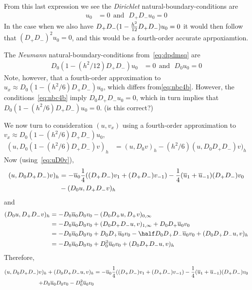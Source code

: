 From this last expression we see the {\em Dirichlet} natural-boundary-conditions are 
\begin{align}
   u_0 &= 0 ~~\text{and}~~~  D_+D_- u_0 =0  \label{eq:nbc4a} 
\end{align}
In the case when we also have $D_+D_-(1-{h^2\over 12}D_+D_-)u_0=0$ it would then follow that $(D_+D_-)^2u_0=0$,
and this would be a fourth-order accurate aprpoxiamtion.



The {\em Neumann} natural-boundary-conditions from~\eqref{eq:dpdmsq} are
\begin{align}
   D_0 (1-(h^2/12)D_+D_-)u_0&=0 ~~\text{and}~~~   D_0 u_0=0 \label{eq:nbc4b}
\end{align}
Note, however, that a fourth-order approximation to $u_x\approx D_0 (1-(h^2/6)D_+D_-)u_0$, which differs
from\eqref{eq:nbc4b}.
However, the conditions~\eqref{eq:nbc4b} imply $D_0D_+D_-u_0=0$, which in turn
implies that $D_0 (1-(h^2/6)D_+D_-)u_0=0$. (is this correct?)

\clearpage %
We now turn to consideration $(u,v_x)$ using a fourth-order approximation to $v_x\approx D_0 (1-(h^2/6)D_+D_-)u_0$,
\begin{align}
  (u,D_0 (1-(h^2/6)D_+D_-)v)_h &= (u,D_0 v)_h -(h^2/6) (u,D_0D_+D_-)v )_h
\end{align}
Now (using~\eqref{eq:uD0v}),
\begin{align}
   (u,D_0 D_+D_-)v )_h &= -\overline{u}_0 \frac{1}{4}((D_+D_-)v_1+(D_+D_-)v_{-1}) - \frac{1}{4}(\overline{u}_1+\overline{u}_{-1})(D_+D_-) v_0  \\
                       & - (D_0 u,D_+D_- v)_h  \\
\end{align}
and
\begin{align}
   (D_0 u,D_+D_- v)_h  &= -D_0\ubar_0 D_0 v_0 - (D_0 D_+ u,D_+ v)_{0,\infty} \\
            &= -D_0\ubar_0 D_0 v_0 + (D_0 D_+ D_- u, v)_{1,\infty} + D_0 D_+\ubar_0 v_0 \\
            &= -D_0\ubar_0 D_0 v_0 + D_0 D_+\ubar_0 v_0 - \half D_0 D_+ D_- \ubar_0 v_0 + (D_0 D_+ D_- u, v)_h \\
            &= -D_0\ubar_0 D_0 v_0 + D_0^2\ubar_0 v_0 + (D_0 D_+ D_- u, v)_h 
\end{align}
Therefore,
\begin{align*}
   (u,D_0 D_+D_-)v )_h + (D_0 D_+ D_- u, v)_h 
     &= -\overline{u}_0 \frac{1}{4}((D_+D_-)v_1+(D_+D_-)v_{-1}) - \frac{1}{4}(\overline{u}_1+\overline{u}_{-1})(D_+D_-) v_0  \\
        +D_0\overline{u}_0 D_0 v_0 - D_0^2\overline{u}_0 v_0 
\end{align*}



